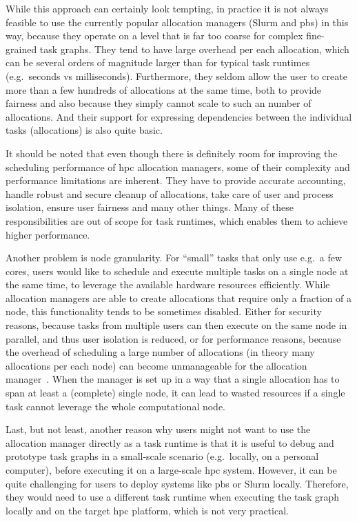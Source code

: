 While this approach can certainly look tempting, in practice it is not always feasible to use the
currently popular allocation managers (Slurm and \gls{pbs}) in this way, because
they operate on a level that is far too coarse for complex fine-grained task graphs. They tend to
have large overhead per each allocation, which can be several orders of magnitude larger than for
typical task runtimes (e.g.\ seconds vs milliseconds). Furthermore, they seldom allow the user to
create more than a few hundreds of allocations at the same time, both to provide fairness and also
because they simply cannot scale to such an number of allocations. And their support for expressing
dependencies between the individual tasks (allocations) is also quite basic.

It should be noted that even though there is definitely room for improving the scheduling
performance of \gls{hpc} allocation managers, some of their complexity and
performance limitations are inherent. They have to provide accurate accounting, handle robust and
secure cleanup of allocations, take care of user and process isolation, ensure user fairness and
many other things. Many of these responsibilities are out of scope for task runtimes, which enables
them to achieve higher performance.

Another problem is node granularity. For ``small'' tasks that only use e.g.\ a few cores, users
would like to schedule and execute multiple tasks on a single node at the same time, to leverage
the available hardware resources efficiently. While allocation managers are able to create
allocations that require only a fraction of a node, this functionality tends to be sometimes
disabled. Either for security reasons, because tasks from multiple users can then execute on the
same node in parallel, and thus user isolation is reduced, or for performance reasons, because the
overhead of scheduling a large number of allocations (in theory many allocations per each node) can
become unmanageable for the allocation manager~\cite{it4i_node_scheduling_policy}. When the manager is set
up in a way that a single allocation has to span at least a (complete) single node, it can lead to
wasted resources if a single task cannot leverage the whole computational node.

Last, but not least, another reason why users might not want to use the allocation manager directly
as a task runtime is that it is useful to debug and prototype task graphs in a small-scale scenario
(e.g.\ locally, on a personal computer), before executing it on a large-scale
\gls{hpc} system. However, it can be quite challenging for users to deploy systems
like \gls{pbs} or Slurm locally. Therefore, they would need to use a different
task runtime when executing the task graph locally and on the target \gls{hpc}
platform, which is not very practical.


